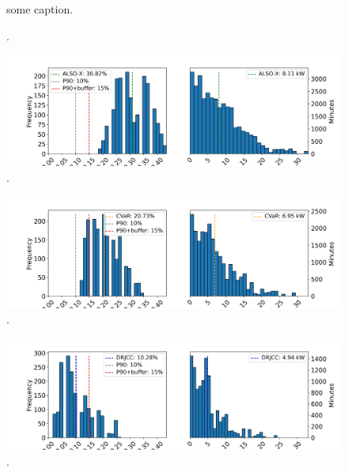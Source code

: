 \documentclass{report}
\begin{document}
\begin{figure}[!t]
    \centering
    
    \caption{some caption.}
\end{figure}

\begin{figure}[!t]
    \centering
    
    \caption{.}
\end{figure}

\begin{figure}[!t]
    \centering
    \includegraphics[width=0.99\columnwidth]{figures/drjcc_oos_histograms_ALSO-X.png}
    \caption{.}
\end{figure}

\begin{figure}[!t]
    \centering
    \includegraphics[width=0.99\columnwidth]{figures/drjcc_oos_histograms_CVaR.png}
    \caption{.}
\end{figure}

\begin{figure}[!t]
    \centering
    \includegraphics[width=0.99\columnwidth]{figures/drjcc_oos_histograms_DRJCC.png}
    \caption{.}
\end{figure}
\end{document}
